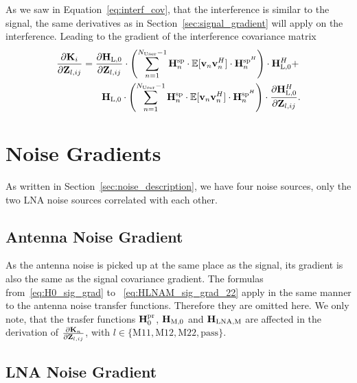 As we saw in Equation~\eqref{eq:interf_cov}, that the interference is similar to the signal, the same derivatives as in Section~\ref{sec:signal_gradient} will apply on the interference.
Leading to the gradient of the interference covariance matrix
\begin{align}
\label{eq:interf_gradient}\nonumber
\frac{\partial\mathbf{K}_i}{\partial\mathbf{Z}_{l,ij}} &= 
	\frac{\partial\mathbf{H}_\text{L,0}}{\partial\mathbf{Z}_{l,ij}} \cdot
	\left(\sum_{n=1}^{N_\text{User}-1} 
	 \mathbf{H}_{n}^{\text{sp}} \cdot 
	\mathbb{E}[\mathbf{v}_{n}\mathbf{v}_{n}^H] \cdot 
	\mathbf{H}_{n}^{\text{sp}^H}\right) \cdot \mathbf{H}_\text{L,0}^H + \\
 &\qquad \mathbf{H}_\text{L,0} \cdot \left(\sum_{n=1}^{N_\text{User}-1} 
	\mathbf{H}_{n}^{\text{sp}} \cdot 
	\mathbb{E}[\mathbf{v}_{n}\mathbf{v}_{n}^H] \cdot 
	\mathbf{H}_{n}^{\text{sp}^H}\right) \cdot \frac{\partial\mathbf{H}_\text{L,0}^H}{\partial\mathbf{Z}_{l,ij}}.
\end{align}

\section{Noise Gradients}
\label{sec:noise_gradient}

As written in Section~\ref{sec:noise_description}, we have four noise sources, only the two LNA noise sources correlated with each other.

\subsection{Antenna Noise Gradient}
\label{sec:ant_noise_grad}
As the antenna noise is picked up at the same place as the signal, its gradient is also the same as the signal covariance gradient.
The formulas from~\eqref{eq:H0_sig_grad} to ~\eqref{eq:HLNAM_sig_grad_22} apply in the same manner to the antenna noise transfer functions.
Therefore they are omitted here.
We only note, that the trasfer functions $\mathbf{H}_0^{\text{pr}}$, $\mathbf{H}_\text{M,0}$ and $\mathbf{H}_\text{LNA,M}$ are affected in the derivation of $\frac{\partial\mathbf{K}_n}{\partial\mathbf{Z}_{l,ij}}$, with $l\in\{\text{M}11,\text{M}12,\text{M}22,\text{pass}\}$.

\subsection{LNA Noise Gradient}
\label{sec:lna_noise_grad}

